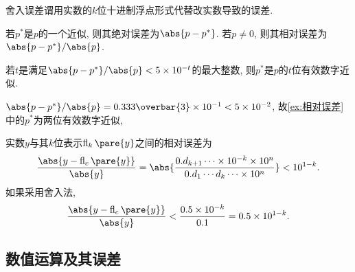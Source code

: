\documentclass[hidelinks]{ctexart}
\DeclareMathOperator{\fl}{fl}
\begin{document}
舍入误差谓用实数的$k$位十进制浮点形式代替改实数导致的误差.
\begin{definition}
    若$p^*$是$p$的一个近似, 则其绝对误差为$\abs{p-p^*}$. 若$p\neq 0$, 则其相对误差为$\abs{p-p^*}/\abs{p}$.
\end{definition}
\begin{definition}
    若$t$是满足$\abs{p-p^*}/\abs{p} < 5\times 10^{-t}$的最大整数, 则$p^*$是$p$的$t$位有效数字近似.
\end{definition}
\begin{ex}
    $\abs{p-p^*}/\abs{p} = 0.333\overbar{3}\times 10^{-1} < 5\times 10^{-2}$, 故\cref{ex:相对误差}中的$p^*$为两位有效数字近似,
\end{ex}
\newpoint{}实数$y$与其$k$位表示$\fl_k\pare{y}$之间的相对误差为
\[ \frac{\abs{y - \fl_c\pare{y}}}{\abs{y}} = \abs{\frac{0.d_{k+1}\cdots \times 10^{-k}\times 10^n}{0.d_1\cdots d_k\cdots \times 10^n}} < 10^{1-k}. \]
如果采用舍入法,
\[ \frac{\abs{y - \fl_c\pare{y}}}{\abs{y}} < \frac{0.5\times 10^{-k}}{0.1} = 0.5\times 10^{1-k}. \]


\subsection{数值运算及其误差} %
\label{sub:数值运算及其误差}
\end{document}
